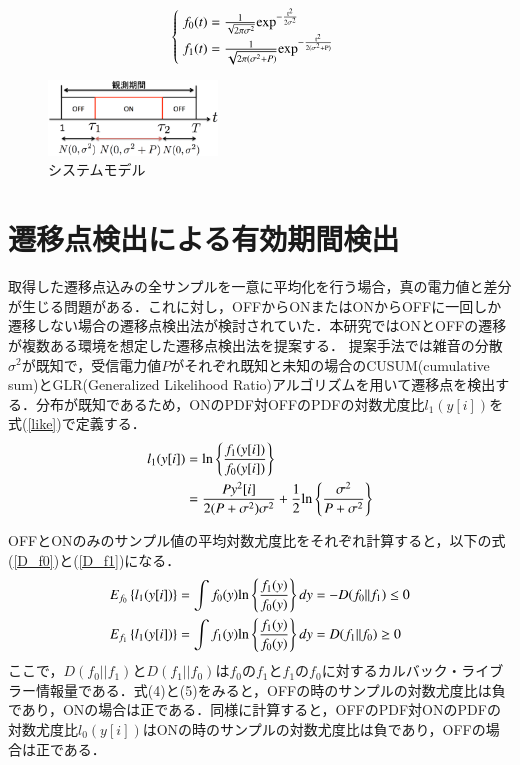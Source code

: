 \documentclass[10pt, twocolumn, a4j]{jsarticle}
\begin{document}
\begin{align}
\begin{cases}
\;f_0(t) = \frac{1}{\sqrt{2\pi\sigma^2}} \rm{exp}^{-\frac{t^2}{2\sigma^2}} \\
\;f_1(t) = \frac{1}{\sqrt{2\pi(\sigma^2+P)}} \rm{exp}^{-\frac{t^2}{2(\sigma^2+P)}}
\end{cases}
\label{normal}
\end{align}

\begin{figure}[t]
\centering
\includegraphics[clip,width=45mm]{systemodel.eps}
\caption{システムモデル}
\label{Systemmodel}
\end{figure}

\section{遷移点検出による有効期間検出}
取得した遷移点込みの全サンプルを一意に平均化を行う場合，真の電力値と差分が生じる問題がある．これに対し，OFFからONまたはONからOFFに一回しか遷移しない場合の遷移点検出法が検討されていた\cite{Quickest_detection}．本研究ではONとOFFの遷移が複数ある環境を想定した遷移点検出法を提案する．
提案手法では雑音の分散$\sigma^2$が既知で，受信電力値$P$がそれぞれ既知と未知の場合のCUSUM(cumulative sum)とGLR(Generalized Likelihood Ratio)アルゴリズムを用いて遷移点を検出する．分布が既知であるため，ONのPDF対OFFのPDFの対数尤度比$l_{1}(y[i])$を式(\ref{like})で定義する．
\begin{align}
l_{1}(y[i]) &= {\rm ln}\left\{\frac{f_1(y[i])}{f_0(y[i])}\right\} \label{like} \\
&=\frac{Py^2[i]}{2(P+\sigma^2)\sigma^2} + \frac{1}{2}{\rm ln}\left\{\frac{\sigma^2}{P+\sigma^2}\right\} \nonumber
\end{align}

OFFとONのみのサンプル値の平均対数尤度比をそれぞれ計算すると，以下の式(\ref{D_f0})と(\ref{D_f1})になる．
\begin{eqnarray}
E_{f_0}\left\{l_1(y[i])\right\} &=\int f_0(y){\rm ln}\left\{\frac{f_1(y)}{f_0(y)}\right\}dy=-D(f_0||f_1)\leq 0 \label{D_f0} \\
E_{f_1}\left\{l_1(y[i])\right\} &=\int f_1(y){\rm ln}\left\{\frac{f_1(y)}{f_0(y)}\right\}dy=D(f_1||f_0)\geq 0 \label{D_f1}
\end{eqnarray}
ここで，$D(f_0||f_1)$と$D(f_1||f_0)$は$f_0$の$f_1$と$f_1$の$f_0$に対するカルバック・ライブラー情報量である．式(4)と(5)をみると，OFFの時のサンプルの対数尤度比は負であり，ONの場合は正である．同様に計算すると，OFFのPDF対ONのPDFの対数尤度比$l_{0}(y[i])$はONの時のサンプルの対数尤度比は負であり，OFFの場合は正である．
\end{document}

